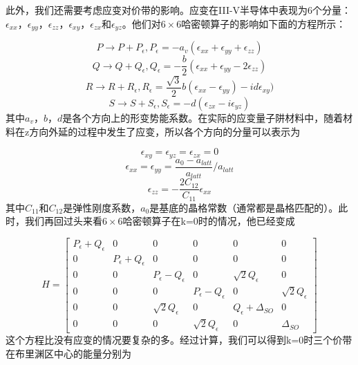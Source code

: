 \documentclass[oneside]{ZJUthesis}
\begin{document}
此外，我们还需要考虑应变对价带的影响。应变在III-V半导体中表现为6个分量：$\epsilon_{xx}$，$\epsilon_{yy}$，$\epsilon_{zz}$，$\epsilon_{xy}$，$\epsilon_{zx}$和$\epsilon_{yz}$。他们对$6\times6$哈密顿算子的影响如下面的方程所示\cite{Calvin1992Spin}：

\begin{equation}
    P \rightarrow P + P_{\epsilon} ,  P_{\epsilon} = - a_v (\epsilon_{xx} + \epsilon_{yy} + \epsilon_{zz})
\end{equation}
\begin{equation}
    Q \rightarrow Q + Q_{\epsilon} ,  Q_{\epsilon} = - \frac{b}{2} (\epsilon_{xx} + \epsilon_{yy} -2 \epsilon_{zz})
\end{equation}
\begin{equation}
    R \rightarrow R + R_{\epsilon} ,  R_{\epsilon} = \frac{\sqrt{3}}{2} b (\epsilon_{xx} - \epsilon_{yy}) - i d \epsilon_{xy})
\end{equation}
\begin{equation}
    S \rightarrow S + S_{\epsilon} ,  S_{\epsilon} = - d (\epsilon_{zx} -i \epsilon_{yz})
\end{equation}
其中$a_v$，$b$，$d$是各个方向上的形变势能系数。在实际的应变量子阱材料中，随着材料在z方向外延的过程中发生了应变，所以各个方向的分量可以表示为

\begin{equation}
    \epsilon_{xy} = \epsilon_{yz} = \epsilon_{zx} = 0
\end{equation}
\begin{equation}
    \epsilon_{xx} = \epsilon_{yy} = \frac{a_0 - a_{latt}}{a_{latt}} / a_{latt}
\end{equation}
\begin{equation}
    \epsilon_{zz} = - \frac{2 C_{12}}{C_{11}}  \epsilon_{xx}
\end{equation}
其中$C_{11}$和$C_{12}$是弹性刚度系数，$a_0$是基底的晶格常数（通常都是晶格匹配的）。此时，我们再回过头来看$6\times6$哈密顿算子在k=0时的情况，他已经变成

\begin{equation}
    H = \left[\begin{array}{cccccc}P_{\epsilon}+Q_{\epsilon} & 0 & 0 & 0 & 0 & 0 \\0 & P_{\epsilon}+Q_{\epsilon} & 0 & 0 & 0 & 0 \\0 & 0 & P_{\epsilon}-Q_{\epsilon} & 0 & \sqrt{2}Q_{\epsilon} & 0 \\0 & 0 & 0 & P_{\epsilon}-Q_{\epsilon} & 0 & \sqrt{2}Q_{\epsilon} \\0 & 0 & \sqrt{2}Q_{\epsilon} & 0 & Q_{\epsilon}+\Delta_{SO} & 0 \\0 & 0 & 0 & \sqrt{2}Q_{\epsilon} & 0 & \Delta_{SO}\end{array}\right]
\end{equation}
这个方程比没有应变的情况要复杂的多。经过计算，我们可以得到k=0时三个价带在布里渊区中心的能量分别为
\end{document}

